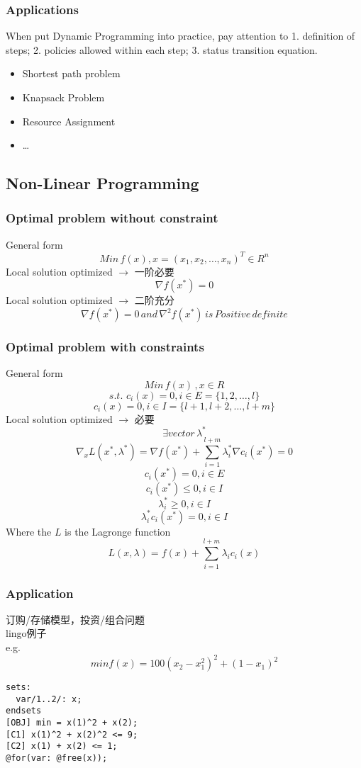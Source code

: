\documentclass[12pt,a4paper]{article} \usepackage{kurier}
\begin{document}
\begin{CJK}{UTF8}{gkai}
\begin{multicols}{2}
		\subsubsection{Applications}
			When put Dynamic Programming into practice, pay attention to 1. definition of steps; 2. policies allowed within each step; 3. status transition equation.
			\begin{itemize}
			\item Shortest path problem
			\item Knapsack Problem
			\item Resource Assignment
			\item \ldots
			\end{itemize}
	\subsection{Non-Linear Programming}
		\subsubsection{Optimal problem without constraint}
			General form \[ Min\, f(x), x = (x_1, x_2, \ldots, x_n)^T \in R^n \]
			Local solution optimized $\to$ 一阶必要  \[ \nabla f(x^*) = 0 \]
			Local solution optimized $\to$ 二阶充分  \[ \nabla f(x^*) = 0 \, and \,\nabla^2 f(x^*)\,is\,Positive\,definite \]
		\subsubsection{Optimal problem with constraints}
			General form \[ Min\, f(x)\, , x \in R \]
			\[ s.t.\,\, c_i(x) = 0, i \in E = \{ 1,2,\ldots,l \} \]
			\[            c_i(x) = 0, i \in I = \{ l+1,l+2,\ldots,l+m \}\]
			Local solution optimized $\to$ 必要
			\[ \exists vector\, \lambda^* \]
			\[ \nabla_x L(x^*,\lambda^*) = \nabla f(x^*) + \sum_{i=1}^{l+m} \lambda_i^* \nabla c_i(x^*) = 0 \]
			\[ c_i (x^*) = 0, i \in E \]
			\[ c_i (x^*) \leq 0, i \in I \]
			\[ \lambda_i^* \geq 0, i \in I \]
			\[ \lambda_i^* c_i (x^*) = 0, i \in I \]
			Where the $L$ is the Lagronge function \[ L(x,\lambda) = f(x) + \sum_{i=1}^{l+m} \lambda_i c_i (x)\]
		\subsubsection{Application}
			订购/存储模型，投资/组合问题\\
			lingo例子\\
			e.g. \[ min f(x) = 100 (x_2 - x_1^2)^2 + (1 - x_1)^2 \]
			\begin{verbatim}
sets:
  var/1..2/: x;
endsets
[OBJ] min = x(1)^2 + x(2);
[C1] x(1)^2 + x(2)^2 <= 9;
[C2] x(1) + x(2) <= 1;
@for(var: @free(x));
			\end{verbatim}

\end{multicols}
\end{CJK}
\end{document}
